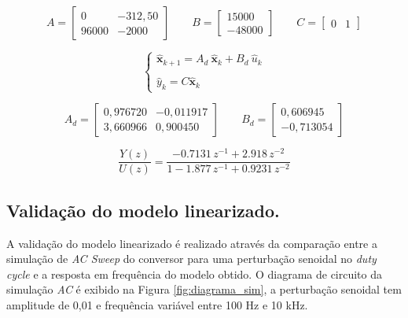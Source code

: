 \documentclass{article}
\begin{document}
\begin{equation}
  A =
  \begin{bmatrix}
    0     & -312,50 \\
    96000 & -2000
  \end{bmatrix} \qquad   B =
  \begin{bmatrix}
    15000 \\
    -48000
  \end{bmatrix} \qquad   C = \begin{bmatrix}
    0 & 1
  \end{bmatrix}
  \label{eq:matrizes_numericas}
\end{equation}

\begin{equation}
  \begin{cases}
    \mathbf{\hat{x}}_{k+1} = A_d \ \mathbf{\hat{x}}_k + B_d \  \hat{u}_k \\ \\
    \hat{y}_k = C \mathbf{\hat{x}}_k
  \end{cases}
  \label{eq:modelo_disc_ss}
\end{equation}

\begin{equation}
  A_d =
  \begin{bmatrix}
    0,976720 & -0,011917 \\
    3,660966 & 0,900450
  \end{bmatrix} \qquad   B_d =
  \begin{bmatrix}
    0,606945 \\
    -0,713054
  \end{bmatrix}
  \label{eq:matrizes_numericas_disc}
\end{equation}

\begin{equation}
  \frac{Y(z)}{U(z)}=
  \frac{-0.7131\,z^{-1} + 2.918\,z^{-2}}
  {1 - 1.877\,z^{-1} + 0.9231\,z^{-2}}
  \label{eq:transf_func}
\end{equation}

\subsection{Validação do modelo linearizado.}

A validação do modelo linearizado é realizado através da comparação entre a simulação de \textit{AC Sweep} do conversor para uma perturbação senoidal no \textit{duty cycle} e a resposta em frequência do modelo obtido. O diagrama de circuito da simulação \textit{AC} é exibido na Figura \ref{fig:diagrama_sim}, a perturbação senoidal tem amplitude de 0,01 e frequência variável entre 100 Hz e 10 kHz.
\end{document}
